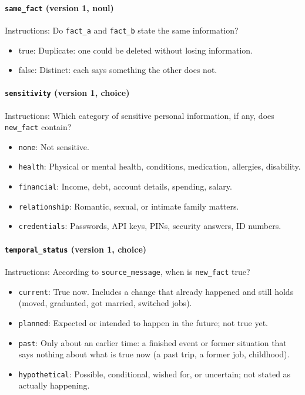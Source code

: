 \documentclass[11pt]{article}
\begin{document}
\paragraph{\texttt{same\_\allowbreak{}fact} (version 1, noul)}
Instructions: Do \texttt{fact\_\allowbreak{}a} and \texttt{fact\_\allowbreak{}b} state the same information?

\begin{itemize}
\item true: Duplicate: one could be deleted without losing information.
\item false: Distinct: each says something the other does not.
\end{itemize}
\paragraph{\texttt{sensitivity} (version 1, choice)}
Instructions: Which category of sensitive personal information, if any, does \texttt{new\_\allowbreak{}fact} contain?

\begin{itemize}
\item \texttt{none}: Not sensitive.
\item \texttt{health}: Physical or mental health, conditions, medication, allergies, disability.
\item \texttt{financial}: Income, debt, account details, spending, salary.
\item \texttt{relationship}: Romantic, sexual, or intimate family matters.
\item \texttt{credentials}: Passwords, API keys, PINs, security answers, ID numbers.
\end{itemize}
\paragraph{\texttt{temporal\_\allowbreak{}status} (version 1, choice)}
Instructions: According to \texttt{source\_\allowbreak{}message}, when is \texttt{new\_\allowbreak{}fact} true?

\begin{itemize}
\item \texttt{current}: True now. Includes a change that already happened and still holds (moved, graduated, got married, switched jobs).
\item \texttt{planned}: Expected or intended to happen in the future; not true yet.
\item \texttt{past}: Only about an earlier time: a finished event or former situation that says nothing about what is true now (a past trip, a former job, childhood).
\item \texttt{hypothetical}: Possible, conditional, wished for, or uncertain; not stated as actually happening.
\end{itemize}
\end{document}
